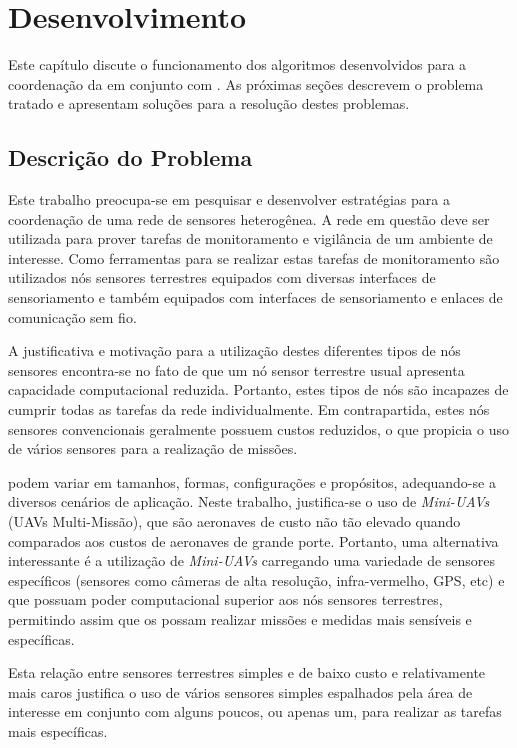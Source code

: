 \chapter{Desenvolvimento}

Este capítulo discute o funcionamento dos algoritmos desenvolvidos para a coordenação da \rssf em conjunto com 
\vants. As próximas seções descrevem o problema tratado e apresentam soluções para a resolução destes problemas.


\section{Descrição do Problema}

Este trabalho preocupa-se em pesquisar e desenvolver estratégias para a
coordenação de uma rede de sensores heterogênea. A rede em questão deve ser
utilizada para prover tarefas de monitoramento e vigilância de um ambiente de
interesse. Como ferramentas para se realizar estas tarefas de monitoramento são
utilizados nós sensores terrestres equipados com diversas interfaces de
sensoriamento e \vants também equipados com interfaces de sensoriamento e
enlaces de comunicação sem fio.

A justificativa e motivação para a utilização destes diferentes tipos de nós
sensores encontra-se no fato de que um nó sensor terrestre usual apresenta
capacidade computacional reduzida. Portanto, estes tipos de nós são incapazes de
cumprir todas as tarefas da rede individualmente. Em contrapartida, estes nós
sensores convencionais geralmente possuem custos reduzidos, o que propicia o uso
de vários sensores para a realização de missões. 

\uavs podem variar em tamanhos, formas, configurações e propósitos, adequando-se
a diversos cenários de aplicação. Neste trabalho, justifica-se o uso de
\emph{Mini-UAVs} (UAVs Multi-Missão), que são aeronaves de custo não tão elevado
quando comparados aos custos de aeronaves de grande porte. Portanto, uma
alternativa interessante é a utilização de \emph{Mini-UAVs} carregando uma
variedade de sensores específicos (sensores como câmeras de alta resolução,
infra-vermelho, GPS, etc) e que possuam poder computacional superior aos nós
sensores terrestres, permitindo assim que os \vants possam realizar missões e
medidas mais sensíveis e específicas.

Esta relação entre sensores terrestres simples e de baixo custo e \vants
relativamente mais caros justifica o uso de vários sensores simples espalhados
pela área de interesse em conjunto com alguns poucos, ou apenas um, \vant para
realizar as tarefas mais específicas. 

